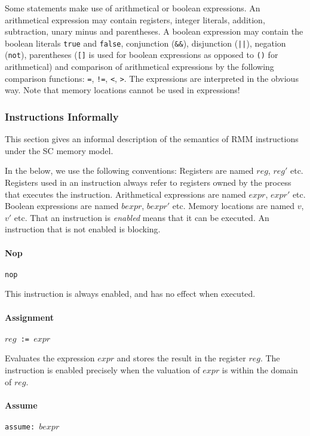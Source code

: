 \documentclass[a4paper]{article}
\begin{document}
Some statements make use of arithmetical or boolean expressions. An
arithmetical expression may contain registers, integer literals,
addition, subtraction, unary minus and parentheses. A boolean
expression may contain the boolean literals \verb+true+ and
\verb+false+, conjunction (\verb+&&+), disjunction (\verb+||+),
negation (\verb+not+), parentheses (\verb+[]+ is used for boolean
expressions as opposed to \verb+()+ for arithmetical) and comparison
of arithmetical expressions by the following comparison functions:
\verb+=+, \verb+!=+, \verb+<+, \verb+>+. The
expressions are interpreted in the obvious way. Note that memory
locations cannot be used in expressions!

\subsubsection{Instructions Informally}

This section gives an informal description of the semantics of RMM
instructions under the SC memory model.

In the below, we use the following conventions: Registers are named
$reg$, $reg'$ etc. Registers used in an instruction always refer to
registers owned by the process that executes the
instruction. Arithmetical expressions are named $expr$, $expr'$
etc. Boolean expressions are named $bexpr$, $bexpr'$ etc. Memory
locations are named $v$, $v'$ etc. That an instruction is
\emph{enabled} means that it can be executed. An instruction that is
not enabled is blocking.

\paragraph{Nop} \verb+nop+

This instruction is always enabled, and has no effect when executed.

\paragraph{Assignment} $reg$\verb+ := +$expr$

Evaluates the expression $expr$ and stores the result in the register
$reg$. The instruction is enabled precisely when the valuation of
$expr$ is within the domain of $reg$.

\paragraph{Assume} \verb+assume: +$bexpr$
\end{document}
